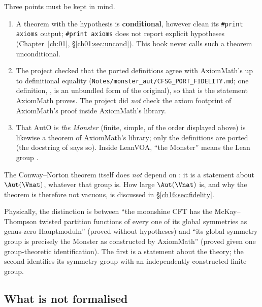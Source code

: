 Three points must be kept in mind.
\begin{enumerate}[label=(\alph*)]
\item A theorem with the hypothesis  is \textbf{conditional}, however clean its
  \texttt{\#print axioms} output; \texttt{\#print axioms} does not report explicit hypotheses
  (Chapter~\ref{ch:01}, \S\ref{ch01:sec:uncond}).  This book never calls such a theorem unconditional.
\item The project checked that the ported definitions agree with AxiomMath's up to definitional equality
  (\texttt{Notes/monster\_aut/CFSG\_PORT\_FIDELITY.md}; one definition, , is an unbundled
  form of the original), so that  is the statement AxiomMath proves.  The project did \emph{not}
  check the axiom footprint of AxiomMath's proof inside AxiomMath's library.
\item That $\mathrm{AutO}$ is \emph{the Monster} (finite, simple, of the order displayed above) is likewise a
  theorem of AxiomMath's library; only the definitions are ported (the docstring of
   says so).  Inside LeanVOA, ``the Monster'' means the Lean group
  .
\end{enumerate}
The Conway--Norton theorem  itself does \emph{not} depend on : it is a statement
about $\Aut(\Vnat)$, whatever that group is.  How large $\Aut(\Vnat)$ is, and why the theorem is therefore not
vacuous, is discussed in \S\ref{ch16:sec:fidelity}.

\begin{physics}
Physically, the distinction is between ``the moonshine CFT has the McKay--Thompson twisted partition functions of
every one of its global symmetries as genus-zero Hauptmoduln'' (proved without hypotheses) and ``its global symmetry
group is precisely the Monster as constructed by AxiomMath'' (proved given one group-theoretic identification).  The
first is a statement about the theory; the second identifies its symmetry group with an independently constructed
finite group.
\end{physics}

\subsection{What is not formalised}

